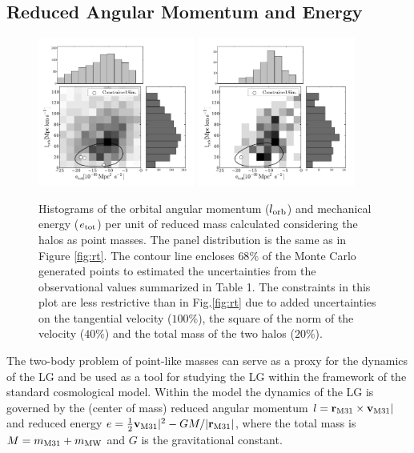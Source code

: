\documentclass{emulateapj}
\begin{document}
\subsection{Reduced Angular Momentum and Energy}

\begin{figure}
\begin{center}
\includegraphics[keepaspectratio=true,width=0.46\textwidth]{./figures/test_EJ_BDM.pdf}
\includegraphics[keepaspectratio=true,width=0.46\textwidth]{./figures/test_EJ_BDM_narrow.pdf}
\caption{Histograms of the orbital angular momentum ($l_{\rm orb}$) and mechanical energy ($e_{\rm tot}$) per unit of reduced mass calculated considering the halos as point masses. The panel distribution is the same as in Figure \ref{fig:rt}. The contour line encloses $68\%$ of the Monte Carlo generated points to estimated the uncertainties from the observational values summarized in Table 1. The constraints in this plot are less restrictive than in Fig.\ref{fig:rt} due to added uncertainties on the tangential velocity ($100\%$), the square of the norm of the velocity ($40\%$) and the total mass of the two halos ($20\%$). }
\label{fig:EJ}
\end{center}
\end{figure}




The two-body problem of point-like masses can serve as a proxy for the dynamics of the LG and be used as a tool for 
studying the LG within the framework of the standard cosmological model.
Within the model the dynamics of the LG is governed by the (center of mass) 
reduced angular momentum $l= {{\bf r}_{\rm M31}}\times{\bf v}_{\rm M31}|$ and reduced energy 
$e=\frac{1}{2} {\bf v}_{\rm M31}|^2 - G M/|{\bf r}_{\rm M31}|$, 
where the total mass is $M=m_{\rm M31}+m_{\rm MW}$
and $G$ is the gravitational constant. %
\end{document}
